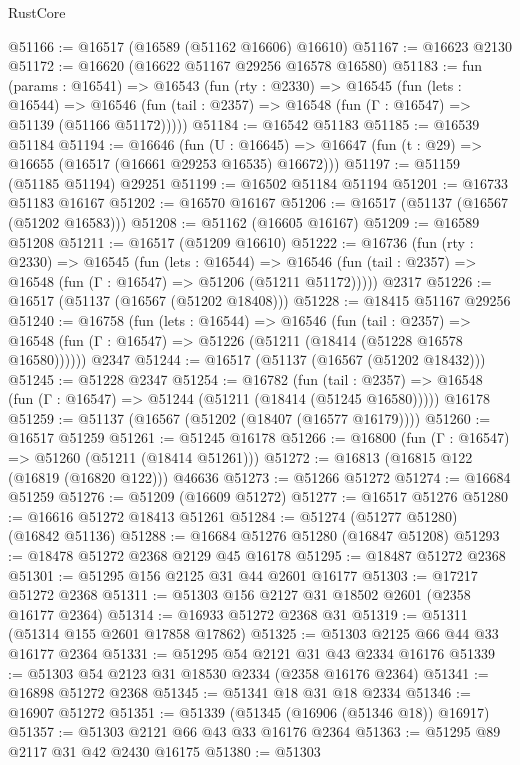 \begin{lexlean}{RustCore}
\begin{coremodule}
@51166 := @16517 (@16589 (@51162 @16606) @16610)
@51167 := @16623 @2130
@51172 := @16620 (@16622 @51167 @29256 @16578 @16580)
@51183 := fun (params : @16541) =>
  @16543
    (fun (rty : @2330) =>
    @16545
      (fun (lets : @16544) =>
      @16546 (fun (tail : @2357) => @16548 (fun (Γ : @16547) => @51139 (@51166 @51172)))))
@51184 := @16542 @51183
@51185 := @16539 @51184
@51194 := @16646
    (fun (U : @16645) => @16647 (fun (t : @29) => @16655 (@16517 (@16661 @29253 @16535) @16672)))
@51197 := @51159 (@51185 @51194) @29251
@51199 := @16502 @51184 @51194
@51201 := @16733 @51183 @16167
@51202 := @16570 @16167
@51206 := @16517 (@51137 (@16567 (@51202 @16583)))
@51208 := @51162 (@16605 @16167)
@51209 := @16589 @51208
@51211 := @16517 (@51209 @16610)
@51222 := @16736
    (fun (rty : @2330) =>
    @16545
      (fun (lets : @16544) =>
      @16546 (fun (tail : @2357) => @16548 (fun (Γ : @16547) => @51206 (@51211 @51172)))))
    @2317
@51226 := @16517 (@51137 (@16567 (@51202 @18408)))
@51228 := @18415 @51167 @29256
@51240 := @16758
    (fun (lets : @16544) =>
    @16546
      (fun (tail : @2357) =>
      @16548 (fun (Γ : @16547) => @51226 (@51211 (@18414 (@51228 @16578 @16580))))))
    @2347
@51244 := @16517 (@51137 (@16567 (@51202 @18432)))
@51245 := @51228 @2347
@51254 := @16782
    (fun (tail : @2357) => @16548 (fun (Γ : @16547) => @51244 (@51211 (@18414 (@51245 @16580)))))
    @16178
@51259 := @51137 (@16567 (@51202 (@18407 (@16577 @16179))))
@51260 := @16517 @51259
@51261 := @51245 @16178
@51266 := @16800 (fun (Γ : @16547) => @51260 (@51211 (@18414 @51261)))
@51272 := @16813 (@16815 @122 (@16819 (@16820 @122))) @46636
@51273 := @51266 @51272
@51274 := @16684 @51259
@51276 := @51209 (@16609 @51272)
@51277 := @16517 @51276
@51280 := @16616 @51272 @18413 @51261
@51284 := @51274 (@51277 @51280) (@16842 @51136)
@51288 := @16684 @51276 @51280 (@16847 @51208)
@51293 := @18478 @51272 @2368 @2129 @45 @16178
@51295 := @18487 @51272 @2368
@51301 := @51295 @156 @2125 @31 @44 @2601 @16177
@51303 := @17217 @51272 @2368
@51311 := @51303 @156 @2127 @31 @18502 @2601 (@2358 @16177 @2364)
@51314 := @16933 @51272 @2368 @31
@51319 := @51311 (@51314 @155 @2601 @17858 @17862)
@51325 := @51303 @2125 @66 @44 @33 @16177 @2364
@51331 := @51295 @54 @2121 @31 @43 @2334 @16176
@51339 := @51303 @54 @2123 @31 @18530 @2334 (@2358 @16176 @2364)
@51341 := @16898 @51272 @2368
@51345 := @51341 @18 @31 @18 @2334
@51346 := @16907 @51272
@51351 := @51339 (@51345 (@16906 (@51346 @18)) @16917)
@51357 := @51303 @2121 @66 @43 @33 @16176 @2364
@51363 := @51295 @89 @2117 @31 @42 @2430 @16175
@51380 := @51303

\end{coremodule}
\end{lexlean}
